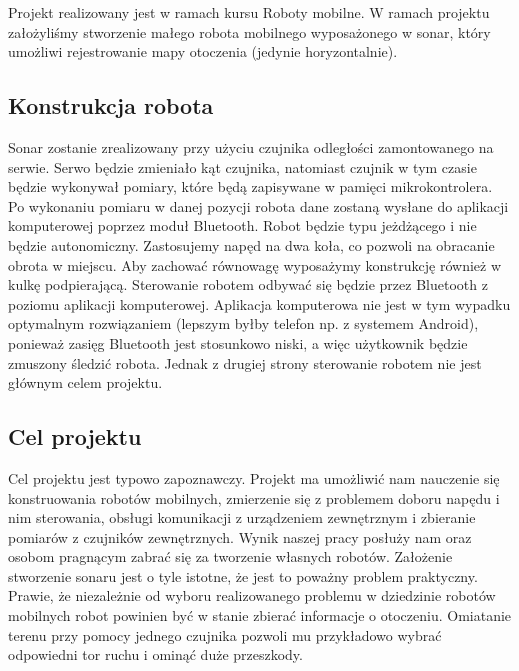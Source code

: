 Projekt realizowany jest w ramach kursu Roboty mobilne. W ramach projektu założyliśmy stworzenie małego robota mobilnego wyposażonego w sonar, który umożliwi rejestrowanie mapy otoczenia (jedynie horyzontalnie).
\subsection{Konstrukcja robota}
Sonar zostanie zrealizowany przy użyciu czujnika odległości zamontowanego na serwie. Serwo będzie zmieniało kąt czujnika, natomiast czujnik w tym czasie będzie wykonywał pomiary, które będą zapisywane w pamięci mikrokontrolera. Po wykonaniu pomiaru w danej pozycji robota dane zostaną wysłane do aplikacji komputerowej poprzez moduł Bluetooth. \newline 
Robot będzie typu jeżdżącego i nie będzie autonomiczny. Zastosujemy napęd na dwa koła, co pozwoli na obracanie obrota w miejscu. Aby zachować równowagę wyposażymy konstrukcję również w kulkę podpierającą. Sterowanie robotem odbywać się będzie przez Bluetooth z poziomu aplikacji komputerowej. Aplikacja komputerowa nie jest w tym wypadku optymalnym rozwiązaniem (lepszym byłby telefon np. z systemem Android), ponieważ zasięg Bluetooth jest stosunkowo niski, a więc użytkownik będzie zmuszony śledzić robota. Jednak z drugiej strony sterowanie robotem nie jest głównym celem projektu.
\subsection{Cel projektu}
Cel projektu jest typowo zapoznawczy. Projekt ma umożliwić nam nauczenie się konstruowania robotów mobilnych, zmierzenie się z problemem doboru napędu i nim sterowania, obsługi komunikacji z urządzeniem zewnętrznym i zbieranie pomiarów z czujników zewnętrznych. Wynik naszej pracy posłuży nam oraz osobom pragnącym zabrać się za tworzenie własnych robotów. \newline
Założenie stworzenie sonaru jest o tyle istotne, że jest to poważny problem praktyczny. Prawie, że niezależnie od wyboru realizowanego problemu w dziedzinie robotów mobilnych robot powinien być w stanie zbierać informacje o otoczeniu. Omiatanie terenu przy pomocy jednego czujnika pozwoli mu przykładowo wybrać odpowiedni tor ruchu i ominąć duże przeszkody. 


